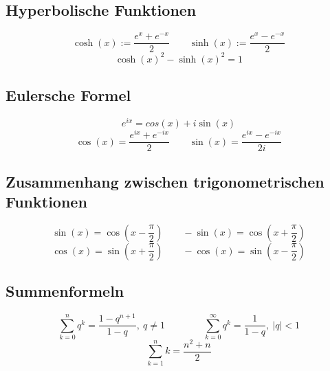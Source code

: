 \documentclass[10pt,a4paper]{article}
\begin{document}
\subsection*{Hyperbolische Funktionen}
\[\cosh(x) := \frac{e^x + e^{-x}}{2} \qquad \sinh(x) := \frac{e^x - e^{-x}}{2}\] 
\[\cosh(x)^2 - \sinh(x)^2 = 1\]

\subsection*{Eulersche Formel}
\[e^{ix}=cos(x)+i\sin(x)\]
\[\cos(x)=\frac{e^{ix}+e^{-ix}}{2}\qquad \sin(x)=\frac{e^{ix}-e^{-ix}}{2i}\]

\subsection*{Zusammenhang zwischen trigonometrischen Funktionen}
\[\sin(x)=\cos\left(x-\frac{\pi}{2}\right) \qquad -\sin(x)=\cos\left(x+\frac{\pi}{2}\right)\]
\[\cos(x)=\sin\left(x+\frac{\pi}{2}\right) \qquad -\cos(x)=\sin\left(x-\frac{\pi}{2}\right)\]

\subsection*{Summenformeln}
\[\sum_{k=0}^n q^k = \frac{1 - q^{n+1}}{1 - q}, ~ q \neq 1  \qquad\qquad \sum_{k=0}^{\infty} q^k = \frac{1}{1 - q}, ~ |q| < 1\]
\[\sum_{k=1}^{n} k = \frac{n^2+n}{2}\]
\end{document}
